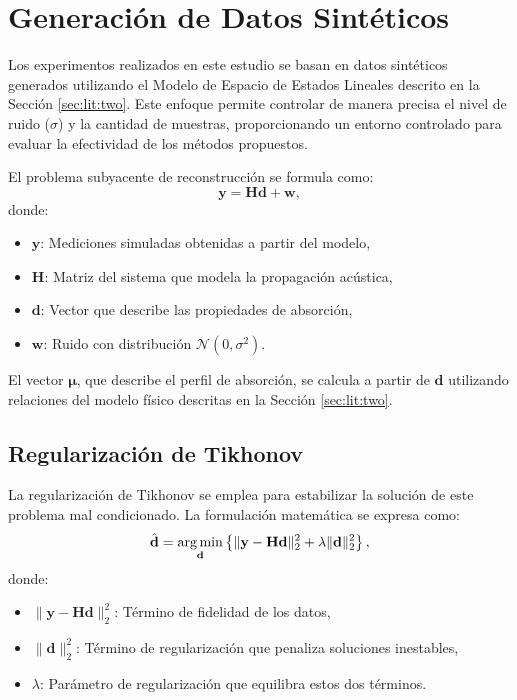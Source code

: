 
\section{Generación de Datos Sintéticos} \label{sec:method:data}

Los experimentos realizados en este estudio se basan en datos sintéticos generados utilizando el Modelo de Espacio de Estados Lineales descrito en la Sección \ref{sec:lit:two}. Este enfoque permite controlar de manera precisa el nivel de ruido (\( \sigma \)) y la cantidad de muestras, proporcionando un entorno controlado para evaluar la efectividad de los métodos propuestos.

El problema subyacente de reconstrucción se formula como:
\begin{equation}
    \mathbf{y} = \mathbf{H} \mathbf{d} + \mathbf{w},
\end{equation}
donde:
\begin{itemize}
    \item \( \mathbf{y} \): Mediciones simuladas obtenidas a partir del modelo,
    \item \( \mathbf{H} \): Matriz del sistema que modela la propagación acústica,
    \item \( \mathbf{d} \): Vector que describe las propiedades de absorción,
    \item \( \mathbf{w} \): Ruido con distribución \( \mathcal{N}(0, \sigma^2) \).
\end{itemize}

El vector \( \mathbf{\mu} \), que describe el perfil de absorción, se calcula a partir de \( \mathbf{d} \) utilizando relaciones del modelo físico descritas en la Sección \ref{sec:lit:two}.

\subsection{Regularización de Tikhonov} \label{sec:method:tikhonov}

La regularización de Tikhonov se emplea para estabilizar la solución de este problema mal condicionado. La formulación matemática se expresa como:
\begin{equation}
    \hat{\mathbf{d}} = \operatorname*{arg\,min}_{\mathbf{d}} \left\{ \| \mathbf{y} - \mathbf{H} \mathbf{d} \|_2^2 + \lambda \| \mathbf{d} \|_2^2 \right\},
\end{equation}
donde:
\begin{itemize}
    \item \( \| \mathbf{y} - \mathbf{H} \mathbf{d} \|_2^2 \): Término de fidelidad de los datos,
    \item \( \| \mathbf{d} \|_2^2 \): Término de regularización que penaliza soluciones inestables,
    \item \( \lambda \): Parámetro de regularización que equilibra estos dos términos.
\end{itemize}

